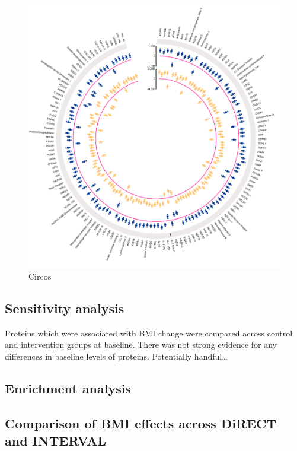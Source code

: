 \documentclass[11pt,twoside]{bristolthesis}
\begin{document}
\begin{figure}
\includegraphics[width=0.95\linewidth]{figure/DiRECT/circos_plot_BMI_change_protein_ols_tsls} \caption[Circos plot of proteins associated with BMI change]{Circos}\label{fig:circos}
\end{figure}
\hypertarget{sensitivity-analysis}{%
\subsection{Sensitivity analysis}\label{sensitivity-analysis}}

Proteins which were associated with BMI change were compared across control and intervention groups at baseline. There was not strong evidence for any differences in baseline levels of proteins. Potentially handful\ldots{}

\hypertarget{enrichment-analysis-1}{%
\subsection{Enrichment analysis}\label{enrichment-analysis-1}}

\hypertarget{comparison-of-bmi-effects-across-direct-and-interval}{%
\subsection{Comparison of BMI effects across DiRECT and INTERVAL}\label{comparison-of-bmi-effects-across-direct-and-interval}}
\end{document}
